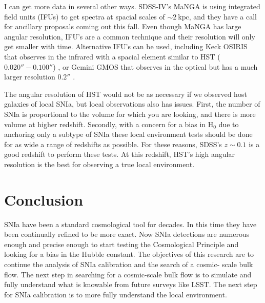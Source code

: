 \documentclass[apj, iop]{emulateapj}
\newcommand{\sn}{SNIa}
\newcommand{\Hubble}{\ensuremath{\text{H}_0}}
\begin{document}
I can get more data in several other ways. SDSS-IV's MaNGA is using integrated
field units (IFUs) to get spectra at spacial scales of $\sim 2 ~\text{kpc}$, and
they have a call for ancillary proposals coming out this fall. Even though MaNGA
has large angular resolution, IFU's are a common technique and their resolution
will only get smaller with time. Alternative IFU's can be used, including Keck
OSIRIS that observes in the infrared with a spacial element similar to HST
($0.020'' - 0.100''$) \citep{OSIRIS},
or Gemini GMOS that observes in the optical but has a much larger resolution
$0.2''$ \citep{Gemini}.

The angular resolution of HST would not be as necessary if we observed host galaxies of
local \sn{}, but local observations also has issues. First, the number of \sn{}
is proportional to the volume for which you are looking, and there is more
volume at higher redshift. Secondly, 
with a concern for a bias in \Hubble{} due to anchoring only a subtype of \sn{} 
these local environment tests should be done for
as wide a range of redshifts as possible. For these reasons, SDSS's $z \sim 0.1$
is a good redshift to perform these tests. At this redshift, HST's high angular
resolution is the best for observing a true local environment.

\section{Conclusion}

\sn{} have been a standard cosmological tool for decades. In this time they
have been continually refined to be more exact. Now \sn{} detections are
numerous enough and precise enough to start testing the Cosmological Principle
and looking for a bias in the Hubble constant.  The objectives of this research
are to continue the analysis of \sn{} calibration and the search of a cosmic-
scale bulk flow. The next step in searching for a cosmic-scale bulk flow is to
simulate and fully understand what is knowable from future surveys like LSST.
The next step for \sn{} calibration is to more fully understand the local
environment.



\end{document}
